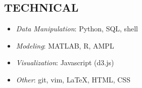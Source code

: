 \documentclass[margin]{res}
\begin{document}
\begin{resume}
%


\section{TECHNICAL}

\begin{minipage}[t]{0.5\textwidth}
\begin{itemize}
 \item 
    \textit{Data Manipulation}: Python, SQL, shell  
\item
\textit{Modeling}: MATLAB, R, AMPL
\end{itemize}
\end{minipage}
\begin{minipage}[t]{0.5\textwidth}
\begin{itemize}
\item
    \textit{Visualization}: Javascript (d3.js)
\item
    \textit{Other}: git, vim, \LaTeX, HTML, CSS
\end{itemize}
\end{minipage}
\vspace{-2mm}



\end{resume}
\end{document}
